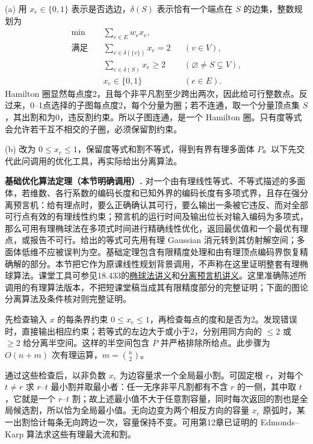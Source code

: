 \begin{solution}
(a) 用 $x_e\in\{0,1\}$ 表示是否选边，$\delta(S)$ 表示恰有一个端点在 $S$ 的边集，整数规划为
\begin{align*}
 \min\quad&\sum_{e\in E}w_e x_e,\\
 \text{满足}\quad&\sum_{e\in\delta(\{v\})}x_e=2&& (v\in V),\\
 &\sum_{e\in\delta(S)}x_e\ge2&& (\varnothing\ne S\subsetneq V),\\
 &x_e\in\{0,1\}&& (e\in E).
\end{align*}
Hamilton 圈显然每点度2，且每个非平凡割至少跨出两次，因此给可行整数点。反过来，0--1点选择的子图每点度2，每个分量为圈；若不连通，取一个分量顶点集 $S$，其出割和为0，违反割约束。所以子图连通，是一个 Hamilton 圈。只有度等式会允许若干互不相交的子圈，必须保留割约束。

(b) 改为 $0\le x_e\le1$，保留度等式和割不等式，得到有界有理多面体 $P$。以下先交代此问调用的优化工具，再实际给出分离算法。

\textbf{基础优化算法定理（本节明确调用）.}
对一个由有理线性等式、不等式描述的多面体，若维数、各行系数的编码长度和已知外界的编码长度有多项式界，且存在强分离预言机：给有理点时，要么正确确认其可行，要么输出一条被它违反、而对全部可行点有效的有理线性约束；预言机的运行时间及输出位长对输入编码为多项式，那么可用有理椭球法在多项式时间进行精确线性优化，返回最优值和一个最优有理点，或报告不可行。给出的等式可先用有理 Gaussian 消元转到其仿射解空间；多面体低维不应被误判为空。基础定理包含有限精度处理和由有理顶点编码界恢复精确解的部分。本节把它作为原课线性规划背景调用，不声称在这里证明整套有理椭球算法。课堂工具可参见18.433的\href{https://ocw.mit.edu/courses/18-433-combinatorial-optimization-fall-2003/resources/l1617/}{椭球法讲义}和\href{https://ocw.mit.edu/courses/18-433-combinatorial-optimization-fall-2003/resources/l18/}{分离预言机讲义}。这里准确陈述所调用的有理算法版本，不把短课堂稿当成其有限精度部分的完整证明；下面的图论分离算法及条件核对则完整证明。

先检查输入 $x$ 的每条界约束 $0\le x_e\le1$，再检查每点的度和是否为2。发现错误时，直接输出相应约束；若等式的左边大于或小于2，分别用同方向的 $\le2$ 或 $\ge2$ 给分离半空间。这样的半空间包含 $P$ 并严格排除所给点。此步骤为 $O(n+m)$ 次有理运算，$m=\binom n2$。

通过这些检查后，以非负数 $x_e$ 为边容量求一个全局最小割。可固定根 $r$，对每个 $t\ne r$ 求 $r$--$t$ 最小割并取最小者：任一无序非平凡割都有不含 $r$ 的一侧，其中取 $t$，它就是一个 $r$--$t$ 割；故上述最小值不大于任意割容量，同时每次返回的割也是全局候选割，所以恰为全局最小值。无向边变为两个相反方向的容量 $x_e$ 原弧时，某一出割恰计每条无向跨边一次，容量保持不变。可用第12章已证明的 Edmonds--Karp 算法求这些有理最大流和割。


\end{solution}
